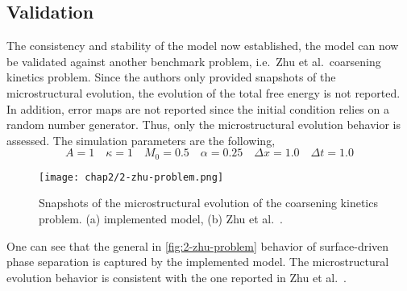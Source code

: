     \subsection{Validation}
    The consistency and stability of the model now established, the model can now be validated against another benchmark problem, i.e.\ Zhu et al.\ coarsening kinetics problem. Since the authors only provided snapshots of the microstructural evolution, the evolution of the total free energy is not reported. In addition, error maps are not reported since the initial condition relies on a random number generator. Thus, only the microstructural evolution behavior is assessed.
    The simulation parameters are the following,
    \begin{equation}
        A = 1 \quad \kappa = 1 \quad M_0 = 0.5 \quad \alpha = 0.25 \quad \Delta x = 1.0 \quad \Delta t = 1.0
    \end{equation}
    \begin{figure}[H]
        \centering
        \texttt{[image: chap2/2-zhu-problem.png]}
        \caption{Snapshots of the microstructural evolution of the coarsening kinetics problem. (a) implemented model, (b) Zhu et al.\ \cite{ZhuChenShenTikare1999}.}
        \label{fig:2-zhu-problem}
    \end{figure}
    One can see that the general in \autoref{fig:2-zhu-problem} behavior of surface-driven phase separation is captured by the implemented model. The microstructural evolution behavior is consistent with the one reported in Zhu et al.\ \cite{ZhuChenShenTikare1999}.
